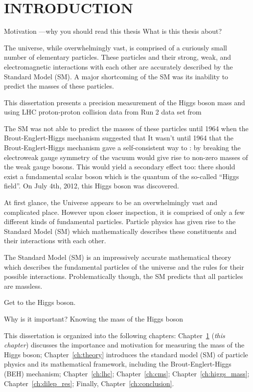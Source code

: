 \chapter{INTRODUCTION}
\label{ch:intro}

Motivation ---why you should read this thesis
What is this thesis about?


The universe, while overwhelmingly vast, is comprised of a curiously small number of elementary particles.
These particles and their strong, weak, and electromagnetic interactions with each other are accurately described by the Standard Model (SM).
A major shortcoming of the SM was its inability to predict the masses of these particles.

This dissertation presents a precision measurement of the Higgs boson mass and using LHC proton-proton collision data from Run 2  data set from  

The SM was not able to predict the masses of these particles until 1964 when the Brout-Englert-Higgs mechanism suggested that 
It wasn't until 1964 that the Brout-Englert-Higgs mechanism gave a self-consistent way to :
by breaking the electroweak gauge symmetry of the vacuum would give rise to non-zero masses of the weak gauge bosons.
This would yield a secondary effect too:
there should exist a fundamental scalar boson which is the quantum of the so-called ``Higgs field''.
On July 4th, 2012, this Higgs boson was discovered.

At first glance, the Universe appears to be an overwhelmingly vast and complicated place.
However upon closer inspection, it is comprised of only a few different kinds of fundamental particles.
Particle physics has given rise to the Standard Model (SM) which mathematically describes these constituents and their interactions with each other.




The Standard Model (SM) is an impressively accurate mathematical theory which describes the fundamental particles of the universe and the rules for their possible interactions.
Problematically though, the SM predicts that all particles are massless.


Get to the Higgs boson.

Why is it important?
Knowing the mass of the Higgs boson 



This dissertation is organized into the following chapters:
Chapter~\ref{ch:intro} (\emph{this chapter}) discusses the importance and motivation for measuring the mass of the Higgs boson;
Chapter~\ref{ch:theory} introduces the standard model (SM) of particle physics and its mathematical framework, including the Brout-Englert-Higgs (BEH) mechanism;
Chapter~\ref{ch:lhc};
Chapter~\ref{ch:cms};
Chapter~\ref{ch:higgs_mass};
Chapter~\ref{ch:dilep_res};
Finally, Chapter~\ref{ch:conclusion}.

